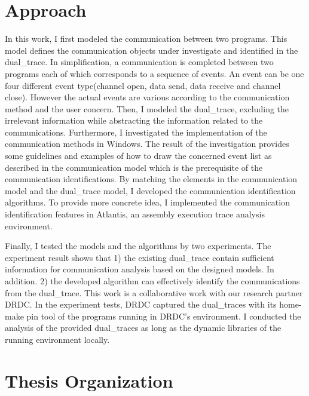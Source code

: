 \section{Approach}
In this work, I first modeled the communication between two programs. This model defines the communication objects under investigate and identified in the dual\_trace. In simplification, a communication is completed between two programs each of which corresponds to a sequence of events. An event can be one four different event type(channel open, data send, data receive and channel close). However the actual events are various according to the communication method and the user concern. Then, I modeled the dual\_trace, excluding the irrelevant information while abstracting the information related to the communications. Furthermore, I investigated the implementation of the communication methods in Windows. The result of the investigation provides some guidelines and examples of how to draw the concerned event list as described in the communication model which is the prerequisite of the communication identifications. By matching the elements in the communication model and the dual\_trace model, I developed the communication identification algorithms. To provide more concrete idea, I implemented the communication identification features in Atlantis\cite{huang2017atlantis}, an assembly execution trace analysis environment.

Finally, I tested the models and the algorithms by two experiments. The experiment result shows that 1) the existing dual\_trace contain sufficient information for communication analysis based on the designed models. In addition. 2) the developed algorithm can effectively identify the communications from the dual\_trace. This work is a collaborative work with our research partner DRDC. In the experiment tests, DRDC captured the dual\_traces with its home-make pin tool of the programs running in DRDC's environment. I conducted the analysis of the provided dual\_traces as long as the dynamic libraries of the running environment locally.

\section{Thesis Organization}
